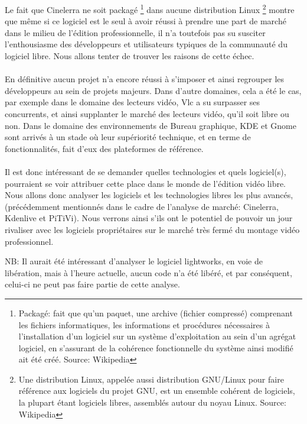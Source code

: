 Le fait que Cinelerra ne soit packagé \footnote{Packagé: fait
que qu'un paquet, une archive (fichier compressé) comprenant les
fichiers informatiques, les informations et procédures nécessaires
à l'installation d'un logiciel sur un système d'exploitation au sein
d'un agrégat logiciel, en s'assurant de la cohérence fonctionnelle
du système ainsi modifié ait été créé. Source: Wikipedia} dans
aucune distribution Linux \footnote {Une distribution Linux, appelée
aussi distribution GNU/Linux pour faire référence aux logiciels du
projet GNU, est un ensemble cohérent de logiciels, la plupart étant
logiciels libres, assemblés autour du noyau Linux. Source: Wikipedia}
montre que même si ce logiciel est le seul à avoir réussi à prendre
une part de marché dans le milieu de l'édition professionnelle,
il n'a toutefois pas su susciter l'enthousiasme des développeurs et
utilisateurs typiques de la communauté du logiciel libre. Nous allons
tenter de trouver les raisons de cette échec.

\paragraph{}

En définitive aucun projet n'a encore réussi à s'imposer et ainsi
regrouper les développeurs au sein de projets majeurs. Dans d'autre
domaines, cela a été le cas, par exemple dans le domaine des lecteurs
vidéo, Vlc a su surpasser ses concurrents, et ainsi supplanter le
marché des lecteurs vidéo, qu'il soit libre ou non. Dans le domaine
des environnements de Bureau graphique, KDE et Gnome sont arrivés à un
stade où leur supériorité technique, et en terme de fonctionnalités,
fait d'eux des plateformes de référence.

\paragraph{}

Il est donc intéressant de se demander quelles technologies et quels
logiciel(s), pourraient se voir attribuer cette place dans le monde
de l'édition vidéo libre. Nous allons donc analyser les logiciels et
les technologies libres les plus avancés, (précédemment mentionnés
dans le cadre de l'analyse de marché: Cinelerra, Kdenlive et PiTiVi).
Nous verrons ainsi s'ils ont le potentiel de pouvoir un jour rivaliser
avec les logiciels propriétaires sur le marché très fermé du montage
vidéo professionnel.

NB: Il aurait été intéressant d'analyser le logiciel lightworks,
en voie de libération, mais à l'heure actuelle, aucun code n'a été
libéré, et par conséquent, celui-ci ne peut pas faire partie de
cette analyse.

